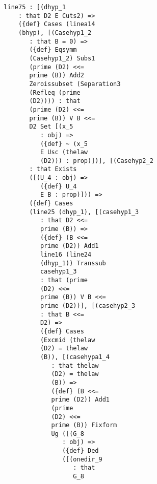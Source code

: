 \documentclass[12pt]{article}
\begin{document}
\begin{verbatim}
                     line75 : [(dhyp_1 
                         : that D2 E Cuts2) => 
                         ({def} Cases (linea14 
                         (bhyp), [(Casehyp1_2 
                            : that B = 0) => 
                            ({def} Eqsymm 
                            (Casehyp1_2) Subs1 
                            (prime (D2) <<= 
                            prime (B)) Add2 
                            Zeroissubset (Separation3 
                            (Refleq (prime 
                            (D2)))) : that 
                            (prime (D2) <<= 
                            prime (B)) V B <<= 
                            D2 Set [(x_5 
                               : obj) => 
                               ({def} ~ (x_5 
                               E Usc (thelaw 
                               (D2))) : prop)])], [(Casehyp2_2 
                            : that Exists 
                            ([(U_4 : obj) => 
                               ({def} U_4 
                               E B : prop)])) => 
                            ({def} Cases 
                            (line25 (dhyp_1), [(casehyp1_3 
                               : that D2 <<= 
                               prime (B)) => 
                               ({def} (B <<= 
                               prime (D2)) Add1 
                               line16 (line24 
                               (dhyp_1)) Transsub 
                               casehyp1_3 
                               : that (prime 
                               (D2) <<= 
                               prime (B)) V B <<= 
                               prime (D2))], [(casehyp2_3 
                               : that B <<= 
                               D2) => 
                               ({def} Cases 
                               (Excmid (thelaw 
                               (D2) = thelaw 
                               (B)), [(casehypa1_4 
                                  : that thelaw 
                                  (D2) = thelaw 
                                  (B)) => 
                                  ({def} (B <<= 
                                  prime (D2)) Add1 
                                  (prime 
                                  (D2) <<= 
                                  prime (B)) Fixform 
                                  Ug ([(G_8 
                                     : obj) => 
                                     ({def} Ded 
                                     ([(onedir_9 
                                        : that 
                                        G_8 

\end{verbatim}
\end{document}
